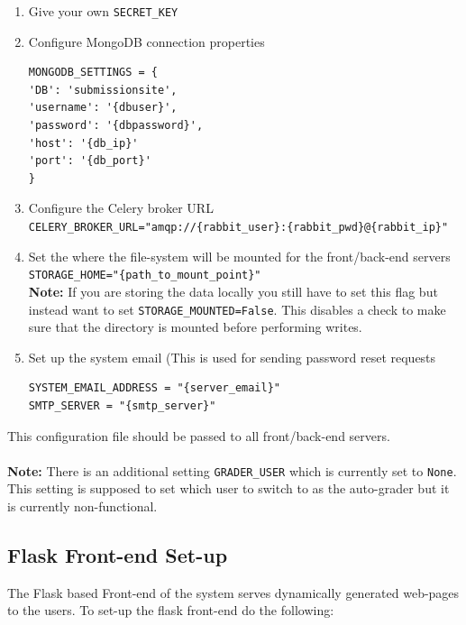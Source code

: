 \documentclass[11pt]{report}
\begin{document}
\begin{enumerate}
\item Give your own \verb|SECRET_KEY|
\item Configure MongoDB connection properties
\begin{verbatim}
MONGODB_SETTINGS = {
'DB': 'submissionsite',
'username': '{dbuser}',
'password': '{dbpassword}',
'host': '{db_ip}'
'port': '{db_port}'
}
\end{verbatim}
\item Configure the Celery broker URL\\
\verb|CELERY_BROKER_URL="amqp://{rabbit_user}:{rabbit_pwd}@{rabbit_ip}"|
\item Set the where the file-system will be mounted for the front/back-end servers\\
\verb|STORAGE_HOME="{path_to_mount_point}"|\\
\textbf{Note:} If you are storing the data locally you still have to set this flag but instead
want to set \verb|STORAGE_MOUNTED=False|. This disables a check to make sure that the directory is
mounted before performing writes.
\item Set up the system email (This is used for sending password reset requests
\begin{verbatim}
SYSTEM_EMAIL_ADDRESS = "{server_email}"
SMTP_SERVER = "{smtp_server}"
\end{verbatim}
\end{enumerate}

This configuration file should be passed to all front/back-end servers.
\\
\\
\noindent\textbf{Note:} There is an additional setting \verb|GRADER_USER| which is currently set to
\verb|None|. This setting is supposed to set which user to switch to as the auto-grader but it
is currently non-functional.

\subsection{Flask Front-end Set-up}
The Flask based Front-end of the system serves dynamically generated web-pages to the users.
To set-up the flask front-end do the following:
\end{document}
